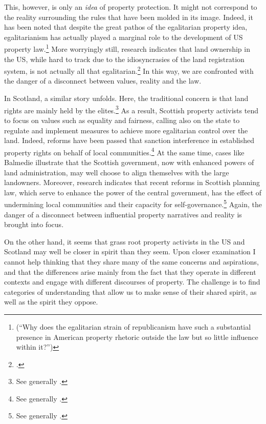 \documentclass[12pt,a4paper]{book} %
\begin{document}
This, however, is only an {\it idea} of property protection. It might not correspond to the reality surrounding the rules that have been molded in its image. Indeed, it has been noted that despite the great pathos of the egalitarian property idea, egalitarianism has actually played a marginal role to the development of US property law.\footnote{\cite[361]{williams98} (``Why does the egalitarian strain of republicanism have such a substantial presence in American property rhetoric outside the law but so little influence within it?'')} More worryingly still, research indicates that land ownership in the US, while hard to track due to the idiosyncrasies of the land registration system, is not actually all that egalitarian.\footcite[246-247]{jacobs98} In this way, we are confronted with the danger of a disconnect between  values, reality and the law.

In Scotland, a similar story unfolds. Here, the traditional concern is that land rights are mainly held by the elites.\footnote{See generally \cite{wightman96,wightman13}.} As a result, Scottish property activists tend to focus on values such as equality and fairness, calling also on the state to regulate and implement measures to achieve more egalitarian control over the land. Indeed, reforms have been passed that sanction interference in established property rights on behalf of local communities.\footnote{See generally \cite{lovett11,hoffman13}.} At the same time, cases like Balmedie illustrate that the Scottish government, now with enhanced powers of land administration, may well choose to align themselves with the large landowners. Moreover, research indicates that recent reforms in Scottish planning law, which serve to enhance the power of the central government, has the effect of undermining local communities and their capacity for self-governance.\footnote{See generally \cite{pacione13,pacione14}.} Again, the danger of a disconnect between influential property narratives and reality is brought into focus.

On the other hand, it seems that grass root property activists in the US and Scotland may well be closer in spirit than they seem. Upon closer examination I cannot help thinking that they share many of the same concerns and aspirations, and that the differences arise mainly from the fact that they operate in different contexts and engage with different discourses of property. The challenge is to find categories of understanding that allow us to make sense of their shared spirit, as well as the spirit they oppose.
\end{document}
